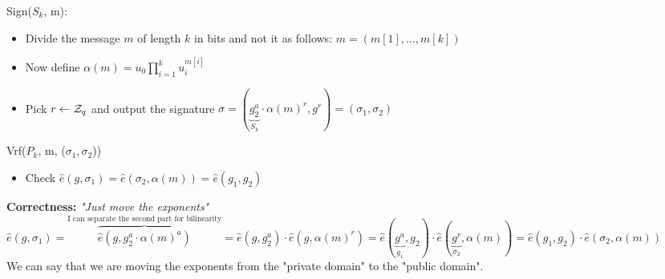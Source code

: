 Sign($S_k$, m):
\begin{itemize}
    \item Divide the message $m$ of length $k$ in bits and not it as follows: $m=(m[1],...,m[k])$
    \item Now define $\alpha(m)=u_0\prod_{i=1}^k u_i^{m[i]}$
    \item Pick $r\leftarrow \mathcal{Z}_q$ and output the signature $\sigma =(\underbrace{g_2^a}_{S_k} \cdot \alpha(m)^r,g^r)=(\sigma_1,\sigma_2)$
\end{itemize}

Vrf($P_k$, m, ($\sigma_1,\sigma_2$))
\begin{itemize}
    \item Check $\hat{e}(g,\sigma_1)=\hat{e}(\sigma_2,\alpha(m))=\hat{e}(g_1,g_2)$
\end{itemize}

\textbf{Correctness:} \textit{"Just move the exponents"}\\ 

$\hat{e}(g,\sigma_1)=\overbrace{\hat{e}(g,g_2^a\cdot \alpha(m)^a)}^{\text{I can separate the second part for bilinearity}}=\hat{e}(g,g_2^a)\cdot \hat{e}(g,\alpha(m)^r)=\hat{e}(\underbrace{g^a}_{g_1},g_2)\cdot \hat{e}(\underbrace{g^r}_{\sigma_2},\alpha(m))=\hat{e}(g_1,g_2)\cdot\hat{e}(\sigma_2,\alpha(m))$\\
We can say that we are moving the exponents from the "private domain" to the "public domain".
